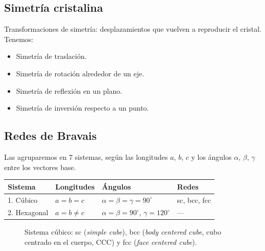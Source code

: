 \documentclass[11pt,a4paper]{article}
\begin{document}
\subsection{Simetría cristalina}
Transformaciones de simetría: desplazamientos que vuelven a reproducir el cristal. Tenemos:
\begin{itemize}
  \item Simetría de traslación.
  \item Simetría de rotación alrededor de un eje.
  \item Simetría de reflexión en un plano.
  \item Simetría de inversión respecto a un punto.
\end{itemize}

\subsection{Redes de Bravais}
Las agruparemos en 7 sistemas, según las longitudes $a$, $b$, $c$ y los ángulos $\alpha$, $\beta$, $\gamma$ entre los vectores base.

\begin{center}
\begin{tabular}{llll}
\toprule
Sistema & Longitudes & Ángulos & Redes\\
\midrule
1. Cúbico & $a=b=c$ & $\alpha=\beta=\gamma=90^\circ$ & sc, bcc, fcc\\
2. Hexagonal & $a=b\neq c$ & $\alpha=\beta=90^\circ$, $\gamma=120^\circ$ & ---\\
\bottomrule
\end{tabular}
\end{center}

\begin{figure}[H]
\centering
{}
\caption{Sistema cúbico: sc (\emph{simple cube}), bcc (\emph{body centered cube}, cubo centrado en el cuerpo, CCC) y fcc (\emph{face centered cube}).}
\end{figure}
\end{document}
